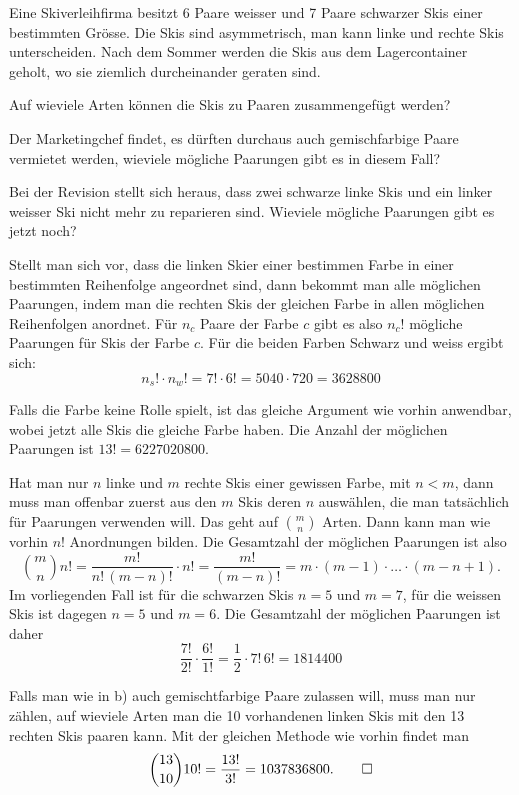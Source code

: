 Eine Skiverleihfirma besitzt 6 Paare weisser und 7 Paare schwarzer Skis
einer bestimmten Grösse. Die Skis sind asymmetrisch, man kann linke
und rechte Skis unterscheiden.
Nach dem Sommer werden die Skis aus dem Lagercontainer geholt, 
wo sie ziemlich durcheinander geraten sind.
\begin{teilaufgaben}
\item Auf wieviele Arten können die Skis zu Paaren zusammengefügt werden?
\item Der Marketingchef findet, es dürften durchaus auch gemischfarbige Paare
vermietet werden, wieviele mögliche Paarungen gibt es in diesem
Fall?
\item Bei der Revision stellt sich heraus, dass zwei schwarze linke Skis
und ein linker weisser Ski nicht mehr zu reparieren sind. Wieviele
mögliche Paarungen gibt es jetzt noch?
\end{teilaufgaben}


\begin{loesung}
\begin{teilaufgaben}
\item Stellt man sich vor, dass die linken Skier einer bestimmen
Farbe in einer bestimmten
Reihenfolge angeordnet sind, dann bekommt man alle möglichen Paarungen,
indem man die rechten Skis der gleichen Farbe in allen möglichen
Reihenfolgen anordnet.
Für $n_c$ Paare der Farbe $c$ gibt es also $n_c!$ mögliche
Paarungen für Skis der Farbe $c$. Für die beiden Farben Schwarz
und weiss ergibt sich:
\[
n_s!\cdot n_w!=7!\cdot 6!=5040\cdot 720=3628800
\]
\item
Falls die Farbe keine Rolle spielt, ist das gleiche Argument wie vorhin
anwendbar, wobei jetzt alle Skis die gleiche Farbe haben. Die Anzahl
der möglichen Paarungen ist $13!=6227020800$.
\item
Hat man nur $n$ linke und $m$ rechte Skis einer gewissen Farbe, mit $n<m$,
dann muss man offenbar zuerst aus den $m$ Skis deren $n$ auswählen,
die man tatsächlich für Paarungen verwenden will. Das geht auf $\binom{m}{n}$
Arten. Dann kann man wie vorhin $n!$ Anordnungen bilden. Die Gesamtzahl
der möglichen Paarungen ist also 
\[
\binom{m}{n}n!=\frac{m!}{n!\,(m-n)!}\cdot n!=\frac{m!}{(m-n)!}
=
m\cdot(m-1)\cdot\dots\cdot(m-n+1).
\]
Im vorliegenden Fall ist für die schwarzen Skis $n=5$ und $m=7$,
für die weissen Skis ist dagegen $n=5$ und $m=6$.
Die Gesamtzahl der möglichen Paarungen ist daher
\[
\frac{7!}{2!}\cdot \frac{6!}{1!}
=\frac12\cdot 7!\,6!=1814400
\]
\end{teilaufgaben}
Falls man wie in b) auch gemischtfarbige Paare zulassen will, muss
man nur zählen, auf wieviele Arten man die 10 vorhandenen
linken Skis mit den 13 rechten Skis paaren kann. Mit der gleichen
Methode wie vorhin findet man
\[
\binom{13}{10}10!=\frac{13!}{3!}=1037836800.
\qedhere
\]
\end{loesung}

